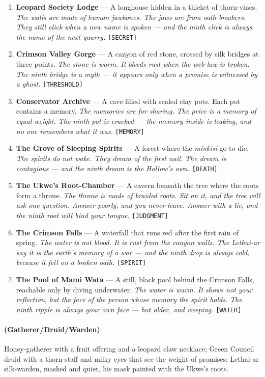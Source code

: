 \begin{enumerate}
\item \textbf{Leopard Society Lodge} --- A longhouse hidden in a thicket of thorn-vines.
  \hfill \textit{The walls are made of human jawbones. The jaws are from oath-breakers. They still click when a new name is spoken --- and the ninth click is always the name of the next quarry.} \texttt{[SECRET]}
\item \textbf{Crimson Valley Gorge} --- A canyon of red stone, crossed by silk bridges at three points.
  \hfill \textit{The stone is warm. It bleeds rust when the web-law is broken. The ninth bridge is a myth --- it appears only when a promise is witnessed by a ghost.} \texttt{[THRESHOLD]}
\item[J] \textbf{Conservator Archive} --- A cave filled with sealed clay pots. Each pot contains a memory.
  \hfill \textit{The memories are for sharing. The price is a memory of equal weight. The ninth pot is cracked --- the memory inside is leaking, and no one remembers what it was.} \texttt{[MEMORY]}
\item[Q] \textbf{The Grove of Sleeping Spirits} --- A forest where the \textit{minkisi} go to die.
  \hfill \textit{The spirits do not wake. They dream of the first nail. The dream is contagious --- and the ninth dream is the Hollow's own.} \texttt{[DEATH]}
\item[K] \textbf{The Ukwe's Root-Chamber} --- A cavern beneath the tree where the roots form a throne.
  \hfill \textit{The throne is made of braided roots. Sit on it, and the tree will ask one question. Answer poorly, and you never leave. Answer with a lie, and the ninth root will bind your tongue.} \texttt{[JUDGMENT]}
\item[A] \textbf{The Crimson Falls} --- A waterfall that runs red after the first rain of spring.
  \hfill \textit{The water is not blood. It is rust from the canyon walls. The Lethai-ar say it is the earth's memory of a war --- and the ninth drop is always cold, because it fell on a broken oath.} \texttt{[SPIRIT]}
\item[A+] \textbf{The Pool of Mami Wata} --- A still, black pool behind the Crimson Falls, reachable only by diving underwater.
  \hfill \textit{The water is warm. It shows not your reflection, but the face of the person whose memory the spirit holds. The ninth ripple is always your own face --- but older, and weeping.} \texttt{[WATER]}
\end{enumerate}

\paragraph*{(Gatherer/Druid/Warden)} Honey-gatherer with a fruit offering and a leopard claw necklace; Green Council druid with a thorn-staff and milky eyes that see the weight of promises; Lethai-ar silk-warden, masked and quiet, his mask painted with the Ukwe's roots.

